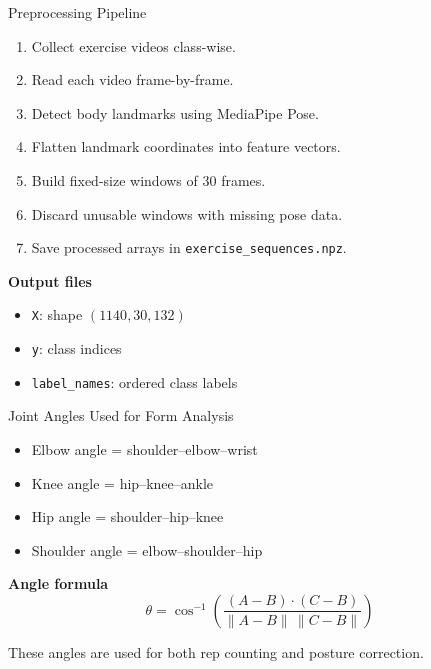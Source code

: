 \documentclass[aspectratio=169]{beamer}
\begin{document}
\begin{frame}{Preprocessing Pipeline}
\begin{enumerate}
  \item Collect exercise videos class-wise.
  \item Read each video frame-by-frame.
  \item Detect body landmarks using MediaPipe Pose.
  \item Flatten landmark coordinates into feature vectors.
  \item Build fixed-size windows of 30 frames.
  \item Discard unusable windows with missing pose data.
  \item Save processed arrays in \texttt{exercise\_sequences.npz}.
\end{enumerate}

\vspace{0.3cm}
\textbf{Output files}
\begin{itemize}
  \item \texttt{X}: shape \((1140, 30, 132)\)
  \item \texttt{y}: class indices
  \item \texttt{label\_names}: ordered class labels
\end{itemize}
\end{frame}

\begin{frame}{Joint Angles Used for Form Analysis}
\small
\begin{itemize}
  \item Elbow angle = shoulder--elbow--wrist
  \item Knee angle = hip--knee--ankle
  \item Hip angle = shoulder--hip--knee
  \item Shoulder angle = elbow--shoulder--hip
\end{itemize}

\vspace{0.3cm}
\textbf{Angle formula}
\[
\theta = \cos^{-1}\left(
\frac{(A-B)\cdot(C-B)}{\lVert A-B\rVert \, \lVert C-B\rVert}
\right)
\]

\vspace{0.3cm}
These angles are used for both rep counting and posture correction.
\end{frame}
\end{document}
